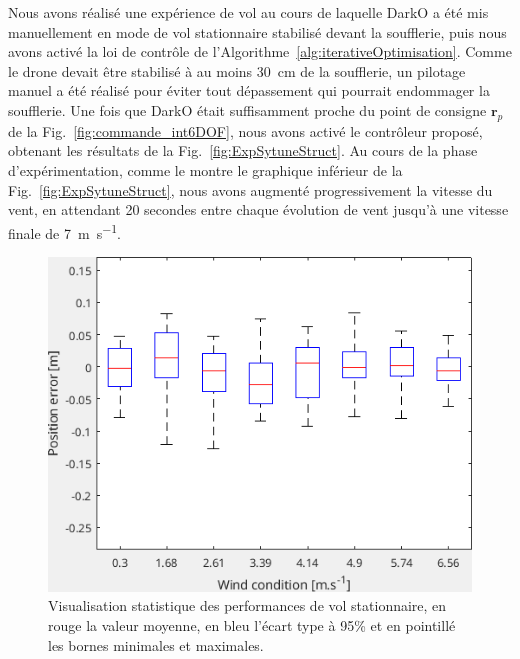 Nous avons réalisé une expérience de vol au cours de laquelle DarkO a été mis manuellement en mode de vol stationnaire stabilisé devant la soufflerie, puis nous avons activé la loi de contrôle de l'Algorithme~\ref{alg:iterativeOptimisation}. Comme le drone devait être stabilisé à au moins \SI{30}{\centi\meter} de la soufflerie, un pilotage manuel a été réalisé pour éviter tout dépassement qui pourrait endommager la soufflerie. Une fois que DarkO était suffisamment proche du point de consigne $\boldsymbol{r}_{p}$ de la Fig.~\ref{fig:commande_int6DOF}, nous avons activé le contrôleur proposé, obtenant les résultats de la Fig.~\ref{fig:ExpSytuneStruct}. Au cours de la phase d'expérimentation, comme le montre le graphique inférieur de la Fig.~\ref{fig:ExpSytuneStruct}, nous avons augmenté progressivement la vitesse du vent, en attendant 20 secondes entre chaque évolution de vent jusqu'à une vitesse finale de \SI{7}{\meter\per\second}.


\begin{figure}[ht!]
    \centering
    \includegraphics[trim=0cm 0cm 0cm 0cm,clip,width=0.6\columnwidth]{figures/boxplot.png}
    \caption{Visualisation statistique des performances de vol stationnaire, en rouge la valeur moyenne, en bleu l'écart type à 95\% et en pointillé les bornes minimales et maximales.}
    \label{fig:statpos}
\end{figure}

